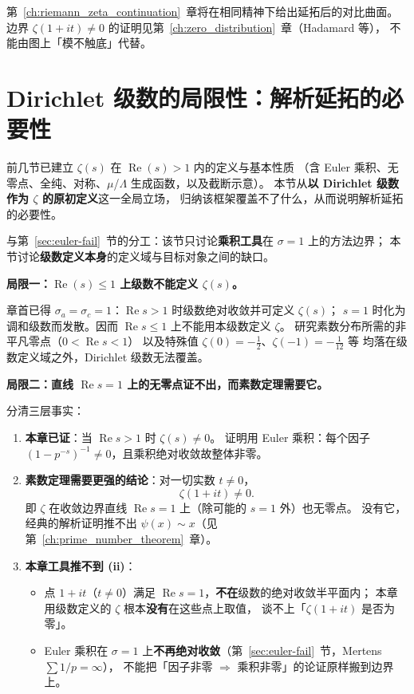 \vspace{0.5em}
\noindent
第~\ref{ch:riemann_zeta_continuation}~章将在相同精神下给出延拓后的对比曲面。
边界 $\zeta(1+it)\neq 0$ 的证明见第~\ref{ch:zero_distribution}~章（Hadamard 等），
不能由图上「模不触底」代替。

\section{Dirichlet 级数的局限性：解析延拓的必要性}
\label{sec:limitations}

前几节已建立 $\zeta(s)$ 在 $\operatorname{Re}(s) > 1$ 内的定义与基本性质
（含 Euler 乘积、无零点、全纯、对称、$\mu$/$\Lambda$ 生成函数，以及截断示意）。
本节从\textbf{以 Dirichlet 级数作为 $\zeta$ 的原初定义}这一全局立场，
归纳该框架覆盖不了什么，从而说明解析延拓的必要性。

与第~\ref{sec:euler-fail}~节的分工：该节只讨论\textbf{乘积工具}在 $\sigma=1$ 上的方法边界；
本节讨论\textbf{级数定义本身}的定义域与目标对象之间的缺口。

\medskip
\textbf{局限一：$\operatorname{Re}(s)\le 1$ 上级数不能定义 $\zeta(s)$。}

章首已得 $\sigma_a=\sigma_c=1$：$\operatorname{Re}s>1$ 时级数绝对收敛并可定义 $\zeta(s)$；
$s=1$ 时化为调和级数而发散。因而 $\operatorname{Re}s\le 1$ 上不能用本级数定义 $\zeta$。
研究素数分布所需的非平凡零点（$0<\operatorname{Re}s<1$）
以及特殊值 $\zeta(0)=-\frac12$、$\zeta(-1)=-\frac1{12}$ 等
均落在级数定义域之外，Dirichlet 级数无法覆盖。

\medskip
\textbf{局限二：直线 $\operatorname{Re}s=1$ 上的无零点证不出，而素数定理需要它。}

分清三层事实：

\begin{enumerate}[label=(\roman*)]
  \item \textbf{本章已证}：当 $\operatorname{Re}s>1$ 时 $\zeta(s)\neq 0$。
        证明用 Euler 乘积：每个因子 $(1-p^{-s})^{-1}\neq 0$，且乘积绝对收敛故整体非零。
  \item \textbf{素数定理需要更强的结论}：对一切实数 $t\neq 0$，
        \[
          \zeta(1+it)\neq 0.
        \]
        即 $\zeta$ 在收敛边界直线 $\operatorname{Re}s=1$ 上（除可能的 $s=1$ 外）也无零点。
        没有它，经典的解析证明推不出 $\psi(x)\sim x$（见第~\ref{ch:prime_number_theorem}~章）。
  \item \textbf{本章工具推不到 (ii)}：
        \begin{itemize}
          \item 点 $1+it$（$t\neq 0$）满足 $\operatorname{Re}s=1$，\textbf{不在}级数的绝对收敛半平面内；
                本章用级数定义的 $\zeta$ 根本\textbf{没有}在这些点上取值，
                谈不上「$\zeta(1+it)$ 是否为零」。
          \item Euler 乘积在 $\sigma=1$ 上\textbf{不再绝对收敛}（第~\ref{sec:euler-fail}~节，Mertens $\sum 1/p=\infty$），
                不能把「因子非零 $\Rightarrow$ 乘积非零」的论证原样搬到边界上。
        \end{itemize}
\end{enumerate}

